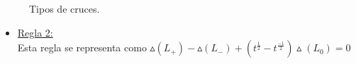 \begin{figure}[h!]
	\centering
	\caption{Tipos de cruces.}
	\label{alex1} 
\end{figure}


\begin{itemize}
	\item \underline{Regla 2:} \\
	Esta regla se representa como $\vartriangle(L_{+}) - \vartriangle(L_{-}) +  (t^{\frac{1}{2}} - t^{\frac{-1}{2}}) \vartriangle(L_{0})  = 0$
\end{itemize}

